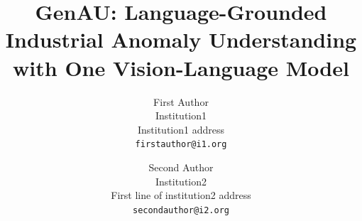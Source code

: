 \documentclass[10pt,twocolumn,letterpaper]{article}
\title{GenAU: Language-Grounded Industrial Anomaly Understanding with One Vision-Language Model}
\author{First Author\\
Institution1\\
Institution1 address\\
{\tt\small firstauthor@i1.org}
\and
Second Author\\
Institution2\\
First line of institution2 address\\
{\tt\small secondauthor@i2.org}
}
\begin{document}
\maketitlesupplementary
\renewcommand{\thetable}{A\arabic{table}}
\renewcommand{\thefigure}{A\arabic{figure}}


{
    \small
    
    
}
\end{document}

